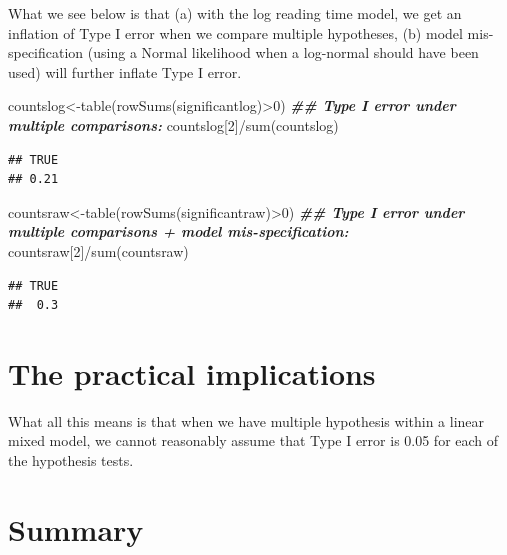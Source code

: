 \documentclass[
  12pt,
]{krantz}
\newenvironment{Shaded}{\begin{snugshade}}{\end{snugshade}}
\newcommand{\DecValTok}[1]{\textcolor[rgb]{0.00,0.00,0.81}{#1}}
\newcommand{\DocumentationTok}[1]{\textcolor[rgb]{0.56,0.35,0.01}{\textbf{\textit{#1}}}}
\newcommand{\FunctionTok}[1]{\textcolor[rgb]{0.00,0.00,0.00}{#1}}
\newcommand{\NormalTok}[1]{#1}
\newcommand{\OtherTok}[1]{\textcolor[rgb]{0.56,0.35,0.01}{#1}}
\newcommand{\SpecialCharTok}[1]{\textcolor[rgb]{0.00,0.00,0.00}{#1}}
\theoremstyle{definition}
\theoremstyle{definition}
\theoremstyle{definition}
\theoremstyle{definition}
\theoremstyle{remark}
\begin{document}
What we see below is that (a) with the log reading time model, we get an inflation of Type I error when we compare multiple hypotheses, (b) model mis-specification (using a Normal likelihood when a log-normal should have been used) will further inflate Type I error.

\begin{Shaded}
\begin{Highlighting}[]
\NormalTok{countslog}\OtherTok{\textless{}{-}}\FunctionTok{table}\NormalTok{(}\FunctionTok{rowSums}\NormalTok{(significantlog)}\SpecialCharTok{\textgreater{}}\DecValTok{0}\NormalTok{)}
\DocumentationTok{\#\# Type I error under multiple comparisons:}
\NormalTok{countslog[}\DecValTok{2}\NormalTok{]}\SpecialCharTok{/}\FunctionTok{sum}\NormalTok{(countslog)}
\end{Highlighting}
\end{Shaded}

\begin{verbatim}
## TRUE 
## 0.21
\end{verbatim}

\begin{Shaded}
\begin{Highlighting}[]
\NormalTok{countsraw}\OtherTok{\textless{}{-}}\FunctionTok{table}\NormalTok{(}\FunctionTok{rowSums}\NormalTok{(significantraw)}\SpecialCharTok{\textgreater{}}\DecValTok{0}\NormalTok{)}
\DocumentationTok{\#\# Type I error under multiple comparisons + model mis{-}specification:}
\NormalTok{countsraw[}\DecValTok{2}\NormalTok{]}\SpecialCharTok{/}\FunctionTok{sum}\NormalTok{(countsraw)}
\end{Highlighting}
\end{Shaded}

\begin{verbatim}
## TRUE 
##  0.3
\end{verbatim}

\hypertarget{the-practical-implications}{%
\section{The practical implications}\label{the-practical-implications}}

What all this means is that when we have multiple hypothesis within a linear mixed model, we cannot reasonably assume that Type I error is 0.05 for each of the hypothesis tests.

\hypertarget{summary-7}{%
\section{Summary}\label{summary-7}}
\end{document}
